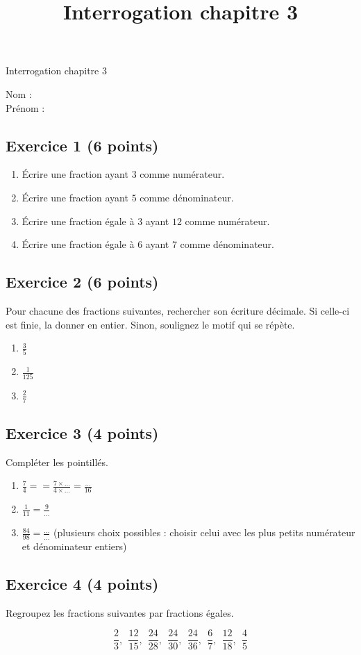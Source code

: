 \documentclass[14 pt]{extarticle}
\title{Interrogation chapitre 3}
\date{}
\theoremstyle{plain}
\begin{document}
\begin{center}{\Large Interrogation chapitre 3}\\ 
 \end{center}
 Nom : \\
 Prénom : \\
 \subsection*{Exercice 1 (6 points)}
 

\begin{enumerate}
\item Écrire une fraction ayant $3$ comme numérateur. 
\item Écrire une fraction ayant $5$ comme dénominateur. 
\item Écrire une fraction égale à $3$ ayant $12$ comme numérateur. 
\item Écrire une fraction égale à $6$ ayant $7$ comme dénominateur.
\end{enumerate}

\subsection*{Exercice 2 (6 points)}
Pour chacune des fractions suivantes, 
rechercher son écriture décimale. Si celle-ci est finie, la donner en entier. Sinon, soulignez le motif qui se répète. 

\begin{enumerate}
\item $\frac35$
\item $\frac1{125}$ 
\item $\frac{2}{7}$
\end{enumerate}
\subsection*{Exercice 3 (4 points)}

Compléter les pointillés. 

\begin{enumerate}
\item $\frac74= = \frac{7 \times \ldots}{4 \times \ldots}= 
\frac{\ldots}{16}$
\item $\frac1{11}= \frac{9}{\ldots}$
\item $\frac{84}{98}= \frac\ldots{\ldots}$  (plusieurs choix possibles : choisir celui avec les plus petits numérateur et dénominateur entiers)
\end{enumerate}

\subsection*{Exercice 4 (4 points)}

Regroupez les fractions suivantes par fractions égales. 

\[ \frac23, \ \  
 \frac{12}{15}, \ \    
 \frac{24}{28}, \ \  
 \frac{24}{30}, \ \  
  \frac{24}{36}, \ \  
   \frac67, \ \  
      \frac{12}{18}, \ \  
       \frac{4}{5}\]


 	
\end{document}
